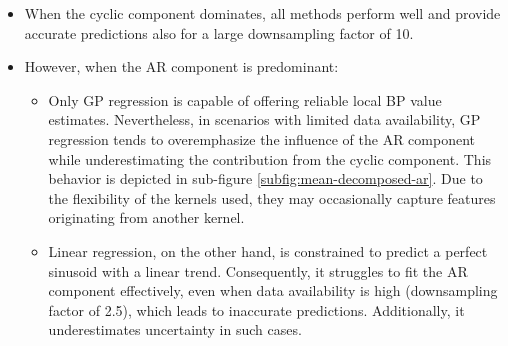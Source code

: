 \begin{itemize}
    \item When the cyclic component dominates, all methods perform well and
    provide accurate predictions also for a large downsampling factor of 10.
    \item However, when the AR component is predominant:

    \begin{itemize}
        \item  Only GP regression is capable of offering reliable local BP value estimates.
        Nevertheless, in scenarios with limited data availability, GP regression tends to overemphasize the influence of
        the AR component while underestimating the contribution from the cyclic component.
        This behavior is depicted in sub-figure \ref{subfig:mean-decomposed-ar}.
        Due to the flexibility of the kernels used, they may occasionally capture features originating from another kernel.
        \item Linear regression, on the other hand, is constrained
        to predict a perfect sinusoid with a linear trend.
        Consequently, it struggles to fit the AR component effectively,
        even when data availability is high (downsampling factor of 2.5), which leads to inaccurate predictions.
        Additionally, it underestimates uncertainty in such cases.
    \end{itemize}
\end{itemize}


